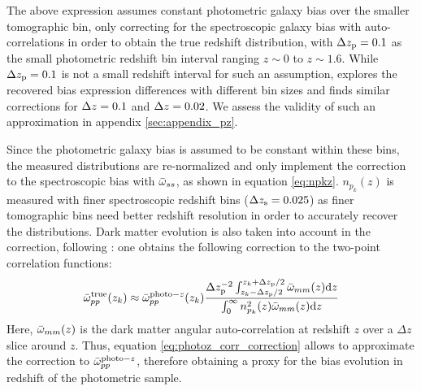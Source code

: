 The above expression assumes constant photometric galaxy bias over the smaller tomographic bin, only correcting for the spectroscopic galaxy bias with auto-correlations in order to obtain the true redshift distribution, with $\Delta z_{\mathrm{p}}=0.1$ as the small photometric redshift bin interval ranging $z\sim0$ to $z\sim1.6$. While $\Delta z_{\mathrm{p}}=0.1$ is not a small redshift interval for such an assumption, \cite{EuclidClusterRedshifts2025} explores the recovered bias expression differences with different bin sizes and finds similar corrections for $\Delta z=0.1$ and $\Delta z=0.02$. We assess the validity of such an approximation in appendix \ref{sec:appendix_pz}.

Since the photometric galaxy bias is assumed to be constant within these bins, the measured distributions are re-normalized and only implement the correction to the spectroscopic bias with $\bar{\omega}_{ss}$, as shown in equation \ref{eq:npkz}. $n_{p_k}(z)$ is measured with finer spectroscopic redshift bins ($\Delta z_{\mathrm{s}}=0.025$) as finer tomographic bins need better redshift resolution in order to accurately recover the distributions. Dark matter evolution is also taken into account in the correction, following \cite{EuclidClusterRedshifts2025}: one obtains the following correction to the two-point correlation functions: 
\begin{equation}\label{eq:photoz_corr_correction}
    \bar{\omega}_{pp}^{\mathrm{true}}(z_k)\approx\bar{\omega}_{pp}^{\mathrm{photo}-z}(z_k)\frac{\Delta z_{\mathrm{p}}^{-2}\int^{z_k+\Delta z_{\mathrm{p}}/2}_{z_k-\Delta z_{\mathrm{p}}/2}\bar{\omega}_{mm}(z)\mathrm{d}z}{\int_0^{\infty}n_{p_k}^2(z)\bar{\omega}_{mm}(z)\mathrm{d}z}
\end{equation}
Here, $\bar{\omega}_{mm}(z)$ is the dark matter angular auto-correlation at redshift $z$ over a $\Delta z$ slice around $z$. Thus, equation \ref{eq:photoz_corr_correction} allows to approximate the correction to $\bar{\omega}_{pp}^{\mathrm{photo}-z}$, therefore obtaining a proxy for the bias evolution in redshift of the photometric sample.


